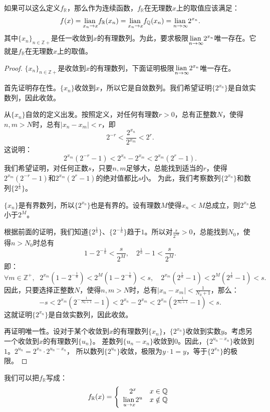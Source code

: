 \documentclass[12pt,UTF8]{ctexbook}
\begin{document}
如果可以这么定义$f_{\mathbb{R}}$，那么作为连续函数，$f_{\mathbb{R}}$在无理数$x$上的取值应该满足：
$$  f(x) = \underset{x_n \to x}{\operatorname{lian}\,}f_{\mathbb{R}}( x_n) = \underset{x_n \to x}{\operatorname{lian}\,}f_{\mathbb{Q}}(x_n) = \underset{n \to \infty}{\operatorname{lian}\,} 2^{x_n}. $$
其中$\{x_n\}_{n\in\mathbb{Z}+}$是任一收敛到$x$的有理数列。为此，要求极限$\underset{n \to \infty}{\operatorname{lian}\,} 2^{x_n}$唯一存在。它就是$f_{\mathbb{R}}$在无理数$x$上的取值。

\begin{proof}
    $\{x_n\}_{n\in\mathbb{Z}+}$是收敛到$x$的有理数列，下面证明极限$\underset{n \to \infty}{\operatorname{lian}\,} 2^{x_n}$唯一存在。

    首先证明存在性。$\{x_n\}$收敛到$x$，所以它是自敛数列。我们希望证明$\{2^{x_n}\}$是自敛实数列，因此收敛。

    从$\{x_n\}$自敛的定义出发。按照定义，对任何有理数$r>0$，总有正整数$N$，使得$n,m>N$时，总有$|x_n - x_m| < r$，即
    $$2^{-r} < \frac{2^{x_n}}{2^{x_m}} < 2^r.$$
    这说明：
    $$ 2^{x_m}(2^{-r} - 1) < 2^{x_n} - 2^{x_m} < 2^{x_m}(2^r - 1).$$
    我们希望证明，对任何正数$s$，只要$n,m$足够大，总能找到适当的$r$，使得$2^{x_m}(2^{-r} - 1)$和$2^{x_m}(2^r - 1)$的绝对值都比$s$小。
    为此，我们考察数列$\{2^{x_n}\}$和数列$\{2^{\frac{1}{n}}\}$。
    
    $\{x_n\}$是有界数列，所以$\{2^{x_n}\}$也是有界的。设有理数$M$使得$x_n < M$总成立，则$2^{x_n}$总小于$2^M$。
    
    根据前面的证明，我们知道$\{2^{\frac{1}{n}}\}$、$\{2^{-\frac{1}{n}}\}$趋于$1$。所以对$\frac{s}{2^M}>0$，总能找到$N_0$，使得$n>N_0$时总有
    $$ 1 - 2^{-\frac{1}{n}} < \frac{s}{2^M}, \quad 2^\frac{1}{n} - 1 < \frac{s}{2^M}. $$
    即：
    $$ \forall m\in\mathbb{Z}^+, \;\,\, 2^{x_m}(1 - 2^{-\frac{1}{n}}) < 2^M(1 - 2^{-\frac{1}{n}}) < s, \quad 2^{x_m}(2^\frac{1}{n} - 1) < 2^M(2^\frac{1}{n} - 1) < s. $$
    因此，只要选择正整数$N$，使得$n,m>N$时，总有$|x_n - x_m| < \frac{1}{N_0+1}$，那么：
    $$ -s < 2^{x_m}(2^{-\frac{1}{N_0+1}} - 1) < 2^{x_n} - 2^{x_m} < 2^{x_m}(2^\frac{1}{N_0+1} - 1) < s.$$
    这就证明$\{2^{x_n}\}$是自敛实数列，因此收敛。

    再证明唯一性。设对于某个收敛到$x$的有理数列$\{x_n\}$，$\{2^{x_n}\}$收敛到实数$y$。考虑另一个收敛到$x$的有理数列$\{u_n\}$。
    差数列$\{u_n - x_n\}$收敛到$0$。因此，$\{2^{u_n - x_n}\}$收敛到$1$。$2^{u_n} = 2^{x_n} \cdot 2^{u_n - x_n}$，
    所以数列$\{2^{u_n}\}$收敛，极限为$y \cdot 1 = y$，等于$\{2^{x_n}\}$的极限。
\end{proof}

我们可以把$f_{\mathbb{R}}$写成：
$$
    f_{\mathbb{R}} (x) = \left\{\begin{array}[]{cc}
        2^x & x\in\mathbb{Q} \\
        \lian{u \to x} 2^u & x \notin \mathbb{Q}
    \end{array}\right.
$$
\end{document}
